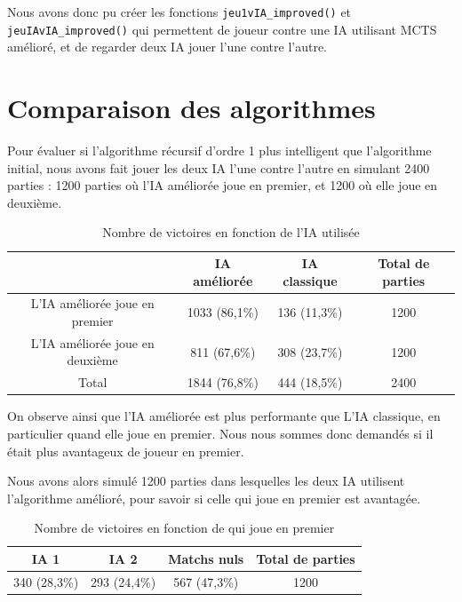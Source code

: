 \documentclass{article}
\begin{document}
Nous avons donc pu créer les fonctions  {\tt jeu1vIA\_improved()} et {\tt jeuIAvIA\_improved()}
qui permettent de joueur contre une IA utilisant MCTS amélioré, et de regarder deux IA jouer l'une contre l'autre.

\section{Comparaison des algorithmes}

Pour évaluer si l'algorithme récursif d'ordre 1 plus intelligent que l'algorithme initial, nous avons fait jouer les deux IA l'une contre l'autre en simulant 2400 parties : 1200 parties où l'IA améliorée joue en premier, et 1200 où elle joue en deuxième.

\begin{table} [H]
    \centering
    \begin{tabular}{|c|c|c|c|}
        \hline
                                        & IA améliorée  & IA classique & Total de parties \\ \hline
        L'IA améliorée joue en premier  & 1033 (86,1\%) & 136 (11,3\%) & 1200             \\ \hline
        L'IA améliorée joue en deuxième & 811 (67,6\%)  & 308 (23,7\%) & 1200             \\ \hline
        Total                           & 1844 (76,8\%) & 444 (18,5\%) & 2400             \\
        \hline
    \end{tabular}
    \caption{Nombre de victoires en fonction de l'IA utilisée}
    \label{tab:1}
\end{table}

On observe ainsi que l'IA améliorée est plus performante que L'IA classique, en particulier quand elle joue en premier. Nous nous sommes donc demandés si il était plus avantageux de joueur en premier.

Nous avons alors simulé 1200 parties dans lesquelles les deux IA utilisent l'algorithme amélioré, pour savoir si celle qui joue en premier est avantagée.

\begin{table} [H]
    \centering
    \begin{tabular}{|c|c|c|c|}
        \hline
        IA 1         & IA 2         & Matchs nuls  & Total de parties \\ \hline
        340 (28,3\%) & 293 (24,4\%) & 567 (47,3\%) & 1200             \\
        \hline
    \end{tabular}
    \caption{Nombre de victoires en fonction de qui joue en premier}
    \label{tab:2}
\end{table}
\end{document}
